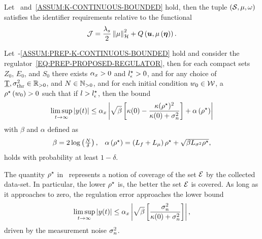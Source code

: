\begin{claim}
	Let~ and~\ref{ASSUM:K-CONTINUOUS-BOUNDED} hold, then the tuple $\left( \mathcal{S}, \mu, \omega \right)$
	satisfies the identifier requirements relative to the functional
   	\begin{equation*}
		\mathcal{J} = \frac{\lambda_s}{2} \left \lVert {\mu} \right \rVert^2_{\mathcal{H}} + Q \left( \boldsymbol{u}, \mu \left( \boldsymbol{\eta} \right) \right).
 	\end{equation*}
\end{claim}
\begin{claim}%
	\label{CLAIM:PREP-REGULATION-BOUND}
	Let~-\ref{ASSUM:PREP-K-CONTINUOUS-BOUNDED} hold and consider the
	regulator~\eqref{EQ:PREP-PROPOSED-REGULATOR}, then for each compact sets $Z_0$, $E_0$, and $S_0$
	there exists $\alpha_{x} > 0$ and $l_{\epsilon}^{\star} > 0$, and for any choice of $\underline{\text{T}}, \sigma^2_{\text{thr}} \in \mathbb{R}_{>0}$, and $N \in \mathbb{N}_{>0}$,
	and for each initial condition $w_0 \in \mathcal{W}$, a $\rho^{\star} \left( w_0 \right) > 0$ such that 
	if $l > l_{\epsilon}^{\star}$, then the bound
	\begin{equation*}
		\limsup_{t \rightarrow \infty} \left| y(t) \right| \le \alpha_{x} \left| \sqrt{\beta} \left[ \kappa(0) - \frac{\kappa(\rho^{\star})^2}{\kappa(0) + \sigma_n^2} \right] + \alpha \left( \rho^{\star} \right) \right|
	\end{equation*}
	with $\beta$ and $\alpha$ defined as
	\begin{equation*}
		\begin{matrix}
			\beta = 2 \log \left( \frac{N}{\delta} \right), &
			\alpha \left( \rho^{\star} \right) = \left( L_{f} + L_{\mu} \right) \rho^{\star} + \sqrt{\beta L_{\sigma^2} \rho^{\star}},
		\end{matrix}
	\end{equation*}
	holds with probability at least $1-\delta$.
\end{claim}
\begin{remark}
   The quantity $\rho^{\star}$ in~ represents a notion of coverage of the set $\mathcal{E}$ by the collected data-set.
   In particular, the lower $\rho^{\star}$ is, the better the set $\mathcal{E}$ is covered. As long as it approaches to zero, the regulation error approaches the lower bound
   \begin{equation*}
      \limsup_{t \rightarrow \infty} \left| y(t) \right| \le \alpha_{x} \left| \sqrt{\beta} \left[ \frac{\sigma_n^2}{\kappa(0) + \sigma_n^2} \right] \right|,
   \end{equation*}
   driven by the measurement noise $\sigma_n^2$.
\end{remark}

